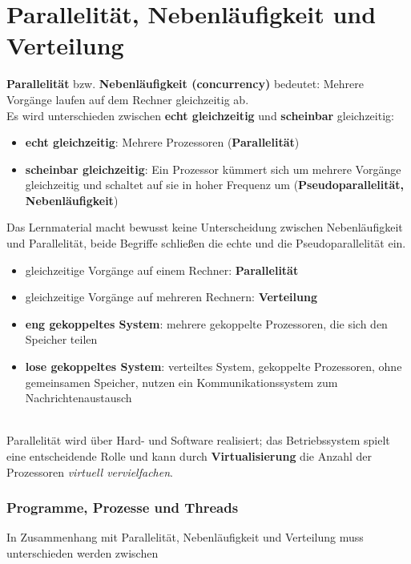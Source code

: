 \chapter{Parallelität, Nebenläufigkeit und Verteilung}


\textbf{Parallelität} bzw. \textbf{Nebenläufigkeit (concurrency)} bedeutet: Mehrere Vorgänge laufen auf dem Rechner gleichzeitig ab.\\

Es wird unterschieden zwischen \textbf{echt gleichzeitig} und \textbf{scheinbar} gleichzeitig:
\begin{itemize}
    \item \textbf{echt gleichzeitig}: Mehrere Prozessoren (\textbf{Parallelität})
    \item \textbf{scheinbar gleichzeitig}: Ein Prozessor kümmert sich um mehrere Vorgänge gleichzeitig und schaltet auf sie in hoher Frequenz um (\textbf{Pseudoparallelität, Nebenläufigkeit})
\end{itemize}

Das Lernmaterial macht bewusst keine Unterscheidung zwischen Nebenläufigkeit und Parallelität, beide Begriffe schließen die echte und die Pseudoparallelität ein.

\begin{itemize}[label=$\rightarrow$]
    \item gleichzeitige Vorgänge auf einem Rechner: \textbf{Parallelität}
    \item gleichzeitige Vorgänge auf mehreren Rechnern: \textbf{Verteilung}
    \item \textbf{eng gekoppeltes System}: mehrere gekoppelte Prozessoren, die sich den Speicher teilen
    \item \textbf{lose gekoppeltes System}: verteiltes System, gekoppelte Prozessoren, ohne gemeinsamen Speicher, nutzen ein Kommunikationssystem zum Nachrichtenaustausch
\end{itemize}\\

Parallelität wird über Hard- und Software realisiert; das Betriebssystem spielt eine entscheidende Rolle und kann durch \textbf{Virtualisierung} die Anzahl der Prozessoren \textit{virtuell vervielfachen}.

\subsection{Programme, Prozesse und Threads}

In Zusammenhang mit Parallelität, Nebenläufigkeit und Verteilung muss unterschieden werden zwischen

